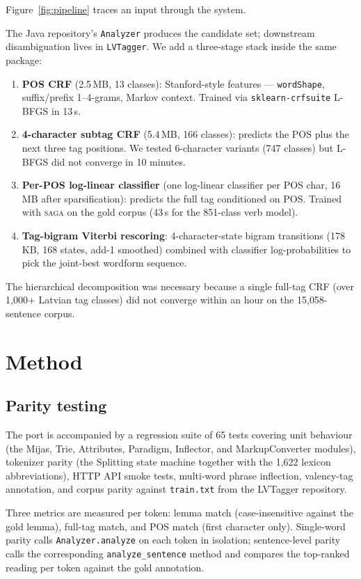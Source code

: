 \documentclass[11pt,a4paper]{article}
\begin{document}
Figure~\ref{fig:pipeline} traces an input through the system.

The Java repository's \texttt{Analyzer} produces the candidate set; downstream
disambiguation lives in \texttt{LVTagger}. We add a three-stage stack inside
the same package:
\begin{enumerate}
\item \textbf{POS CRF} (2.5\,MB, 13 classes):
  Stanford-style features --- \texttt{wordShape}, suffix/prefix 1--4-grams,
  Markov context. Trained via \texttt{sklearn-crfsuite} L-BFGS in 13\,s.
\item \textbf{4-character subtag CRF} (5.4\,MB, 166 classes): predicts the
  POS plus the next three tag positions. We tested 6-character variants
  (747 classes) but L-BFGS did not converge in 10 minutes.
\item \textbf{Per-POS log-linear classifier} (one log-linear classifier
  per POS char, 16\,MB after sparsification): predicts the full tag conditioned
  on POS. Trained with \textsc{saga} \cite{defazio2014} on the gold corpus
  (43\,s for the 851-class verb model).
\item \textbf{Tag-bigram Viterbi rescoring}: 4-character-state bigram
  transitions (178\,KB, 168 states, add-1 smoothed) combined with classifier
  log-probabilities to pick the joint-best wordform sequence.
\end{enumerate}
The hierarchical decomposition was necessary because a single full-tag CRF
(over 1{,}000+ Latvian tag classes) did not converge within an hour on the
15{,}058-sentence corpus.

\section{Method}

\subsection{Parity testing}

The port is accompanied by a regression suite of 65 tests covering
unit behaviour (the Mijas, Trie, Attributes, Paradigm, Inflector, and
MarkupConverter modules), tokenizer parity (the Splitting state machine
together with the 1{,}622 lexicon abbreviations), HTTP API smoke
tests, multi-word phrase inflection, valency-tag annotation, and
corpus parity against \texttt{train.txt} from the LVTagger repository.

{\sloppy
Three metrics are measured per token: lemma match (case-insensitive
against the gold lemma), full-tag match, and POS match (first
character only). Single-word parity calls \texttt{Analyzer.analyze}
on each token in isolation; sentence-level parity calls the
corresponding \texttt{analyze\_sentence} method and compares the
top-ranked reading per token against the gold annotation.\par}
\end{document}

